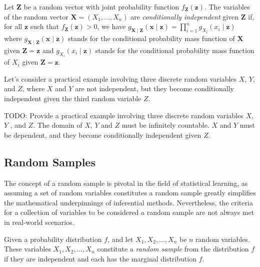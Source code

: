\begin{definition}
Let $\mathbf{Z}$ be a random vector with joint probability function $f_\mathbf{Z} \left( \mathbf{z} \right)$. The variables of the random vector $\mathbf{X} = \left( X_{1}, \ldots, X_{n} \right)$ are \emph{conditionally independent} given $\mathbf{Z}$ if, for all $\mathbf{z}$ such that $f_\mathbf{Z}\left(\mathbf{z}\right)>0$, we have $g_{\mathbf{X} \mid \mathbf{Z}} \left(\mathbf{x}\mid\mathbf{z}\right)=\prod_{i=1}^{n}g_{X_i}\left(x_{i}\mid\mathbf{z}\right)$ where $g_{\mathbf{X} \mid \mathbf{Z}} \left( \mathbf{x} \mid \mathbf{z} \right)$ stands for the conditional probability mass function of $\mathbf{X}$ given $\mathbf{Z}=\mathbf{z}$ and $g_{X_i}\left(x_{i}\mid\mathbf{z}\right)$ stands for the conditional probability mass function of $X_{i}$ given $\mathbf{Z}=\mathbf{z}$.
\end{definition}

Let's consider a practical example involving three discrete random variables $X$, $Y$, and $Z$, where $X$ and $Y$ are not independent, but they become conditionally independent given the third random variable $Z$.

\begin{example}
{\color{red} TODO: Provide a practical example involving three discrete random variables $X$, $Y$ , and $Z$. The domain of $X$, $Y$ and $Z$ must be infinitely countable. $X$ and $Y$ must be dependent, and they become conditionally independent given $Z$.}
\end{example}

\subsection*{Random Samples}

The concept of a random sample is pivotal in the field of statistical learning, as assuming a set of random variables constitutes a random sample greatly simplifies the mathematical underpinnings of inferential methods. Nevertheless, the criteria for a collection of variables to be considered a random sample are not always met in real-world scenarios.

\begin{definition}
Given a probability distribution $f$, and let $X_1, X_2, \ldots, X_n$ be $n$ random variables. These variables $X_1, X_2, \ldots, X_n$ constitute a \emph{random sample} from the distribution $f$ if they are independent and each has the marginal distribution $f$.
\end{definition}


